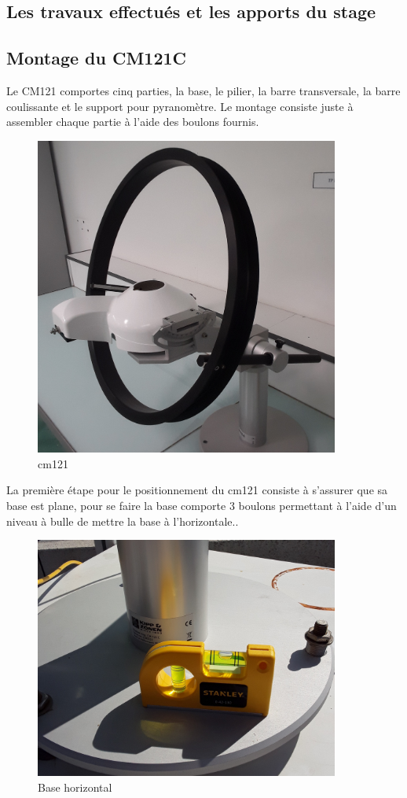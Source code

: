 \documentclass[12pt,a4paper]{article}
\begin{document}
\begin{flushleft}
\section{Les travaux effectués et les apports du stage}



\subsection{Montage du CM121C}

Le CM121 comportes cinq parties, la base, le pilier, la barre transversale, la barre coulissante et le support pour pyranomètre. Le montage consiste juste à assembler chaque partie à l'aide des boulons fournis.

\begin{figure}[H]
\centering
\includegraphics[width=10cm]{image/montage/1.jpg} 
\caption{cm121}
\end{figure}


La première étape pour le positionnement du cm121 consiste à s'assurer que sa base est plane, pour se faire la base comporte 3 boulons permettant à l'aide d'un niveau à bulle de mettre la base à l'horizontale.. 

\begin{figure}[H]
\centering
\includegraphics[width=10cm]{image/montage/2.jpg} 
\caption{Base horizontal}
\end{figure}



\end{flushleft}
\end{document}
